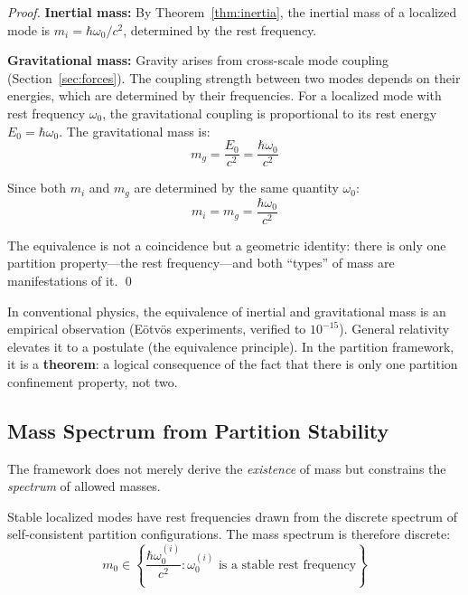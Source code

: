 \begin{proof}
\textbf{Inertial mass:} By Theorem~\ref{thm:inertia}, the inertial mass of a localized mode is $m_i = \hbar\omega_0/c^2$, determined by the rest frequency.

\textbf{Gravitational mass:} Gravity arises from cross-scale mode coupling (Section~\ref{sec:forces}). The coupling strength between two modes depends on their energies, which are determined by their frequencies. For a localized mode with rest frequency $\omega_0$, the gravitational coupling is proportional to its rest energy $E_0 = \hbar\omega_0$. The gravitational mass is:
\begin{equation}
    m_g = \frac{E_0}{c^2} = \frac{\hbar\omega_0}{c^2}
\end{equation}

Since both $m_i$ and $m_g$ are determined by the same quantity $\omega_0$:
\begin{equation}
    m_i = m_g = \frac{\hbar\omega_0}{c^2}
\end{equation}

The equivalence is not a coincidence but a geometric identity: there is only one partition property---the rest frequency---and both ``types'' of mass are manifestations of it. \qed
\end{proof}

\begin{remark}
In conventional physics, the equivalence of inertial and gravitational mass is an empirical observation (E\"{o}tv\"{o}s experiments, verified to $10^{-15}$). General relativity elevates it to a postulate (the equivalence principle). In the partition framework, it is a \textbf{theorem}: a logical consequence of the fact that there is only one partition confinement property, not two.
\end{remark}

\subsection{Mass Spectrum from Partition Stability}

The framework does not merely derive the \textit{existence} of mass but constrains the \textit{spectrum} of allowed masses.

\begin{theorem}
\label{thm:mass-quantization}
Stable localized modes have rest frequencies drawn from the discrete spectrum of self-consistent partition configurations. The mass spectrum is therefore discrete:
\begin{equation}
    m_0 \in \left\{ \frac{\hbar\omega_0^{(i)}}{c^2} : \omega_0^{(i)} \text{ is a stable rest frequency} \right\}
\end{equation}
\end{theorem}

